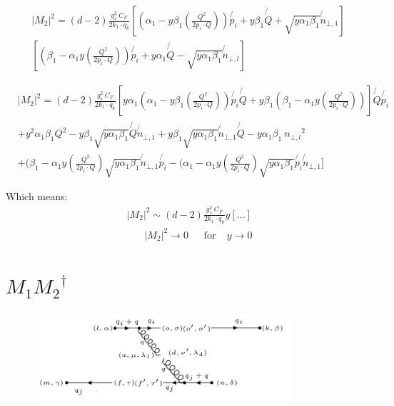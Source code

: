 \begin{equation}
\begin{split}
&|M_2|^2 =(d-2) \frac{g_s^2 \: C_F}{2k_1 \cdot q_k} [(\alpha_1 -y\beta_1(\frac{Q^2}{2p_i \cdot Q})) \not{p_i} + y\beta_1\not{Q} + \sqrt{y\alpha_1\beta_1}\not{n}_{\bot,1}]\: \\
&[(\beta_1 -\alpha_1 y(\frac{Q^2}{2p_i \cdot Q}))\not{p_i} + y\alpha_1\not{Q} - \sqrt{y\alpha_1\beta_1}\not{n}_{\bot,l} ]
\end{split}
\end{equation}


\begin{equation}
\begin{split}
&|M_2|^2 =(d-2) \frac{g_s^2 \: C_F}{2k_1 \cdot q_k} [y\alpha_1(\alpha_1 -y\beta_1(\frac{Q^2}{2p_i \cdot Q}))\not{p_i}\not{Q}  + y\beta_1(\beta_1 -\alpha_1 y(\frac{Q^2}{2p_i \cdot Q}))]\not{Q}\not{p_i}\\
&+y^2\alpha_1\beta_1 Q^2-y\beta_1\sqrt{y\alpha_1\beta_1}\not{Q}\not{n}_{\bot,1}+y\beta_1\sqrt{y\alpha_1\beta_1}\not{n}_{\bot,1}\not{Q}- y\alpha_1\beta_1 \:{{n}_{\bot,l}}^2 \\
&+ (\beta_1 -\alpha_1 y(\frac{Q^2}{2p_i \cdot Q})\sqrt{y\alpha_1\beta_1}\not{n}_{\bot,1}\not{p_i}- (\alpha_1 -\alpha_1 y(\frac{Q^2}{2p_i \cdot Q})\sqrt{y\alpha_1\beta_1}\not{p_i}\not{n}_{\bot,1} ]
\end{split}
\end{equation}

Which means:
\begin{equation}
\begin{split}
&|M_2|^2 \sim(d-2) \frac{g_s^2 \: C_F}{2k_1 \cdot q_k} y[...]\\
&\:\:\:\:\:\:\:\:|M_2|^2\rightarrow 0 \:\:\:\:\:\:\:\text{for}\:\:\:\:\: y\rightarrow 0
\end{split}
\end{equation}
\newpage

\section{$M_1 {M_2}^{\dagger}$}

\begin{figure}[h!]
\centering
\includegraphics[width=0.85\textwidth]{images/M1M2Degaqqg.png}
\end{figure}

